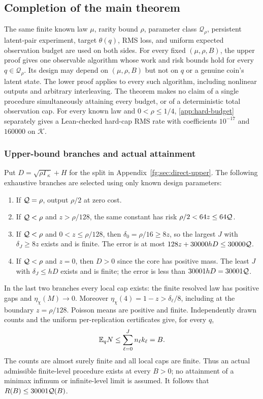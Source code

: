 \subsection{Completion of the main theorem}\label{fg:sec:assembly-contract}
The same finite known law $\mu$, rarity bound $\rho$, parameter class
$\mathcal Q_\rho$, persistent latent-pair experiment, target $\theta(q)$,
RMS loss, and uniform expected observation budget are used on both sides.
For every fixed $(\mu,\rho,B)$, the upper proof gives one observable
algorithm whose work and risk bounds hold for every $q\in\mathcal Q_\rho$.
Its design may depend on $(\mu,\rho,B)$ but not on $q$ or a genuine
coin's latent state. The lower proof applies to every such algorithm,
including nonlinear outputs and arbitrary interleaving.
The theorem makes no claim of a single procedure simultaneously
attaining every budget, or of a deterministic total observation cap.
For every known law and $0<\rho\le1/4$, \cref{app:hard-budget}
separately gives a Lean-checked hard-cap RMS rate with coefficients
$10^{-17}$ and $160000$ on $\mathcal K$.

\subsubsection{Upper-bound branches and actual attainment}
Put $D=\sqrt{\rho\Gamma_\kappa}+H$ for the split in
Appendix~\ref{fg:sec:direct-upper}. The following exhaustive branches are
selected using only known design parameters:
\begin{enumerate}
\item If $\mathcal Q=\rho$, output $\rho/2$ at zero cost.
\item If $\mathcal Q<\rho$ and $z>\rho/128$, the same constant has risk
$\rho/2<64z\le64\mathcal Q$.
\item If $\mathcal Q<\rho$ and $0<z\le\rho/128$, then
$\delta_0=\rho/16\ge8z$, so the largest $J$ with $\delta_J\ge8z$
exists and is finite. The error is at most
$128z+30000hD\le30000\mathcal Q$.
\item If $\mathcal Q<\rho$ and $z=0$, then $D>0$ since the core has positive
mass. The least $J$ with $\delta_J\le hD$ exists and is finite;
the error is less than $30001hD=30001\mathcal Q$.
\end{enumerate}
In the last two branches every local cap exists: the finite resolved law
has positive gaps and $\eta_\chi(M)\to0$. Moreover
$\eta_\chi(4)=1-z>\delta_\ell/8$, including at the boundary $z=\rho/128$.
Poisson means are positive and finite. Independently drawn counts and
the uniform per-replication certificates give, for every $q$,
\[
 \mathbb E_qN\le\sum_{\ell=0}^J n_\ell k_\ell=B.
\]
The counts are almost surely finite and all local caps are finite.
Thus an actual admissible finite-level procedure exists at every $B>0$;
no attainment of a minimax infimum or infinite-level limit is assumed.
It follows that $R(B)\le30001\mathcal Q(B)$.

